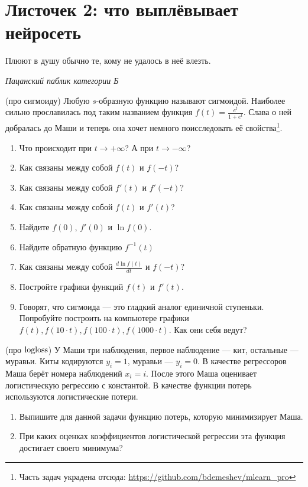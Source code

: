 
\section*{Листочек 2: что выплёвывает нейросеть} 

\epigraph{Плюют в душу обычно те, кому не удалось в неё влезть.}{\textit{Пацанский паблик категории Б}}

\begin{problem}{(про сигмоиду)}
Любую $s$-образную функцию называют сигмоидой. Наиболее сильно прославилась под таким названием функция $f(t) = \frac{e^t}{1 + e^t}.$ Слава о ней добралась до Маши и теперь она хочет немного поисследовать её свойства\footnote{Часть задач украдена отсюда: \url{https://github.com/bdemeshev/mlearn_pro}}. 

\begin{enumerate}
	\item Что происходит при $t \to +\infty$? А при $t \to -\infty$?
	\item Как связаны между собой $f(t)$ и  $f(-t)$?
	\item Как связаны между собой $f'(t)$ и  $f'(-t)$?
	\item Как связаны между собой $f(t)$ и $f'(t)$? 
	\item Найдите $f(0)$, $f'(0)$ и $\ln f(0)$.
	\item Найдите обратную функцию $f^{-1}(t)$
	\item Как связаны между собой $\frac{d\ln f(t)}{dt}$ и $f(-t)$?
	\item Постройте графики функций $f(t)$ и $f'(t)$.
	\item Говорят, что сигмоида --- это гладкий аналог единичной ступеньки. Попробуйте построить на компьютере графики $f(t), f(10\cdot t), f(100\cdot t), f(1000\cdot t)$. Как они себя ведут? 
	\end{enumerate}
\end{problem} 


\begin{problem}{(про $\operatorname{logloss}$)}
	У Маши три наблюдения, первое наблюдение --- кит, остальные --- муравьи. Киты кодируются $y_i = 1$, муравьи --- $y_i = 0$.  В качестве регрессоров Маша берёт номера наблюдений $x_i = i$. После этого Маша оценивает логистическую регрессию с константой. В качестве функции потерь используются логистические потери. 
	
	\begin{enumerate}
		\item Выпишите для данной задачи функцию потерь, которую минимизирует Маша.
		\item При каких оценках коэффициентов логистической регрессии эта функция достигает своего минимума?
	\end{enumerate}
\end{problem}

